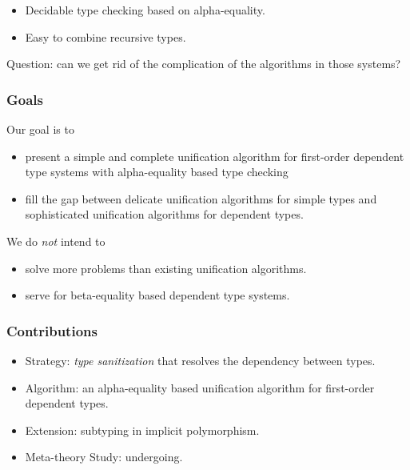 \documentclass{beamer}
\begin{document}
\begin{frame}
\begin{itemize}
{\begin{itemize}
{{              to congruence." ACM SIGPLAN Notices. Vol. 50. No. 1. ACM, 2015.}
            }
        \item Decidable type checking based on alpha-equality.
        \item Easy to combine recursive types.
      \end{itemize}
    \item<3-> Question: can we get rid of the complication of the algorithms in
      those systems?
    }
  \end{itemize}
\end{frame}


\newcommand\hl[1]{{\color{blue} #1}}

\begin{frame}
  \frametitle{Goals}
  Our goal is to
  \begin{itemize}
  \item present a \hl{simple and complete} unification algorithm for
    \hl{first-order} dependent type systems with \hl{alpha-equality} based type
    checking
  \item fill the gap between delicate unification algorithms for simple types
    and sophisticated unification algorithms for dependent types.
  \end{itemize}
  We do \textit{not} intend to
  \begin{itemize}
  \item solve more problems than existing unification algorithms.
  \item serve for beta-equality based dependent type systems.
  \end{itemize}
\end{frame}


\begin{frame}
  \frametitle{Contributions}
  \begin{itemize}
    \item \hl{Strategy}: \textit{type sanitization} that resolves the
      dependency between types.
    \item \hl{Algorithm}: an alpha-equality based unification algorithm for
      first-order dependent types.
    \item \hl{Extension}: subtyping in implicit polymorphism.
    \item \hl{Meta-theory Study}: undergoing.
  \end{itemize}
\end{frame}
\end{document}
